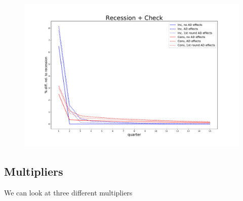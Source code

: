 \documentclass[]{article}
\begin{document}
\begin{figure}
	\centering
	\includegraphics[width=\linewidth]{../FullRun_June7th/recession_Check_relrecession}
	\caption{}
	\label{fig:recessioncheckrelrecession}
\end{figure}


\FloatBarrier
\subsection{Multipliers}

We can look at three different multipliers
\end{document}
